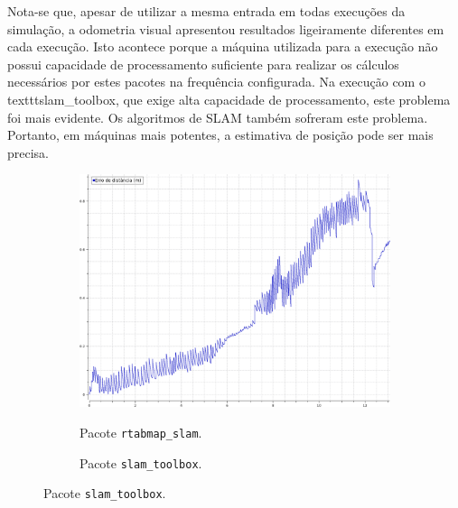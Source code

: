 \documentclass[repeatfields,xlists,xpacks,oneside,yearsonly]{ufrgscca}
\begin{document}
Nota-se que, apesar de utilizar a mesma entrada em todas execuções da
simulação, a odometria visual apresentou resultados ligeiramente
diferentes em cada execução. Isto acontece porque a máquina utilizada
para a execução não possui capacidade de processamento suficiente
para realizar os cálculos necessários por estes pacotes na frequência
configurada. Na execução com o texttt{slam\_toolbox}, que exige alta
capacidade de processamento, este problema foi mais evidente. Os
algoritmos de SLAM também sofreram este problema. Portanto, em
máquinas mais potentes, a estimativa de posição pode ser mais
precisa.

\begin{figure}[h]
    \caption{Erro de posição dos sistemas de localização}
    \label{fig:localization_error}
    \begin{subfigure}{0.5\linewidth}
        {
            \centering
            \caption{Pacote \texttt{rtabmap\_slam}.}
            \label{fig:localization_rtabmap_error}
            \includegraphics[width=0.98\linewidth]{localization-rtabmap-error.png}\\
        }
    \end{subfigure}
    \begin{subfigure}{0.5\linewidth}
        {
            \centering
            \caption{Pacote \texttt{slam\_toolbox}.}
            \label{fig:localization_slam_toolbox_error}
}
\end{subfigure}
\end{figure}
\end{document}
